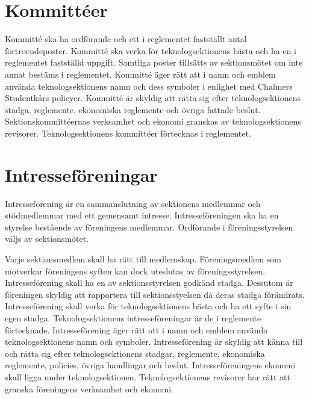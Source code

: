\documentclass[a4paper]{dtek}
\begin{document}
\section{Kommittéer}
\para[Definition] Kommitté ska ha ordförande och ett i reglementet fastställt antal förtroendeposter.
\para Kommitté ska verka för teknologsektionens bästa och ha en i reglementet fastställd uppgift.
\para[Val] Samtliga poster tillsätts av sektionsmötet om inte annat bestäms i reglementet. 
\para[Rättigheter] Kommitté äger rätt att i namn och emblem använda teknologsektionens namn och dess symboler i enlighet med Chalmers Studentkårs policyer.
\para[Skyldigheter] Kommitté är skyldig att rätta sig efter teknologsektionens stadga, reglemente, ekonomiska reglemente och övriga fattade beslut.
\para[Revision] Sektionskommittéernas verksamhet och ekonomi granskas av teknologsektionens revisorer.
\para[Förteckning] Teknologsektionens kommittéer förtecknas i reglementet.

\section{Intresseföreningar}
\para[Definition]
Intresseförening är en sammanslutning av sektionens medlemmar och stödmedlemmar med ett gemensamt intresse. Intresseföreningen ska ha en styrelse bestående av föreningens medlemmar. Ordförande i föreningsstyrelsen väljs av sektionsmötet.

\para Varje sektionsmedlem skall ha rätt till medlemskap. Föreningsmedlem som motverkar föreningens syften kan dock uteslutas av föreningsstyrelsen.
\para[Syfte] Intresseförening skall ha en av sektionsstyrelsen godkänd stadga. Dessutom är föreningen skyldig att rapportera till sektionsstyelsen då deras stadga förändrats.
\para Intresseförening skall verka för teknologsektionens bästa och ha ett syfte i sin egen stadga.
\para Teknologsektionens intresseföreningar är de i reglemente förtecknade.
\para[Rättigheter]Intresseförening äger rätt att i namn och emblem använda teknologsektionens namn och symboler.
\para[Skyldigheter] Intresseförening är skyldig att känna till och rätta sig efter teknologsektionens stadgar, reglemente, ekonomiska reglemente, policies, övriga handlingar och beslut.
\para[Ekonomi] Intresseföreningens ekonomi skall ligga under teknologsektionen.
\para Teknologsektionens revisorer har rätt att granska föreningens verksamhet och ekonomi. 

\end{document}
